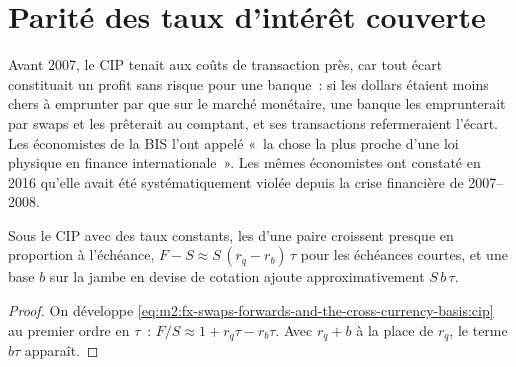 \section{Parité des taux d'intérêt couverte}

Avant 2007, le CIP tenait aux coûts de transaction près, car tout écart constituait un profit
sans risque pour une banque~: si les dollars étaient moins chers à emprunter par 
que sur le marché monétaire, une banque les emprunterait par swaps et les prêterait au comptant,
et ses transactions refermeraient l'écart. Les économistes de la BIS l'ont appelé «~la
chose la plus proche d'une loi physique en finance internationale~». Les mêmes
économistes ont constaté en 2016 qu'elle avait été systématiquement violée depuis
la crise financière de 2007--2008.

\begin{proposition}\label{prop:m2:fx-swaps-forwards-and-the-cross-currency-basis:points}
Sous le CIP avec des taux constants, les  d'une paire croissent presque en
proportion à l'échéance, $F - S \approx S\,(r_q - r_b)\,\tau$ pour les échéances courtes,
et une base $b$ sur la jambe en devise de cotation ajoute approximativement $S\,b\,\tau$.
\end{proposition}

\begin{proof}
On développe \cref{eq:m2:fx-swaps-forwards-and-the-cross-currency-basis:cip} au premier
ordre en $\tau$~: $F/S \approx 1 + r_q\tau - r_b\tau$. Avec $r_q + b$ à la place de
$r_q$, le terme $b\tau$ apparaît.
\end{proof}

